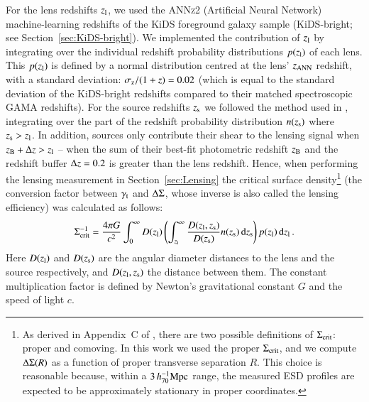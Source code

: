\documentclass{aa}
\newcommand{\hMpc}{\,h_{70}^{-1}{\rm{Mpc}} }
\renewcommand{\Upsigma}{{\rm \Sigma}}
\renewcommand{\Updelta}{{\rm \Delta}}
\newcommand{\un}[1]{_{\rm #1}}
\begin{document}
For the lens redshifts $z\un{l}$, we used the \textsc{ANNz2} (Artificial Neural Network) machine-learning redshifts of the KiDS foreground galaxy sample (KiDS-bright; see Section~\ref{sec:KiDS-bright}). We implemented the contribution of $z\un{l}$ by integrating over the individual redshift probability distributions $p(z\un{l})$ of each lens. This $p(z\un{l})$ is defined by a normal distribution centred at the lens' $z\un{ANN}$ redshift, with a standard deviation: $\sigma\un{z}/(1+z) = 0.02$ (which is equal to the standard deviation of the KiDS-bright redshifts compared to their matched spectroscopic GAMA redshifts). For the source redshifts $z\un{s}$ we followed the method used in \cite{dvornik2018}, integrating over the part of the redshift probability distribution $n(z\un{s})$ where $z\un{s}>z\un{l}$. In addition, sources only contribute their shear to the lensing signal when $z\un{B}+\Updelta z > z\un{l}$ -- when the sum of their best-fit photometric redshift $z\un{B}$ and the redshift buffer $\Updelta z=0.2$ is greater than the lens redshift. Hence, when performing the lensing measurement in Section~\ref{sec:Lensing} the critical surface density\footnote{As derived in Appendix~C of \cite{dvornik2018}, there are two possible definitions of $\Upsigma\un{crit}$: proper and comoving. In this work we used the proper $\Upsigma\un{crit}$, and we compute $\Updelta\Upsigma(R)$ as a function of proper transverse separation $R$. This choice is reasonable because, within a $3 \hMpc$ range, the measured ESD profiles are expected to be approximately stationary in proper coordinates.} (the conversion factor between $\gamma\un{t}$ and $\Updelta\Upsigma$, whose inverse is also called the lensing efficiency) was calculated as follows:
\begin{equation}
\Upsigma\un{crit}^{-1} = \frac{4\pi G}{c^2} \int_{0}^{\infty} D(z\un{l}) \left( \int_{z\un{l}}^{\infty}  \frac{D(z\un{l}, z\un{s})}{D(z\un{s})} n(z\un{s}) \, {\rm d} z\un{s} \right) p(z\un{l}) \, {\rm d} z\un{l} \, .
\label{eq:sigmacrit}
\end{equation}
Here $D(z\un{l})$ and $D(z\un{s})$ are the angular diameter distances to the lens and the source respectively, and $D(z\un{l}, z\un{s})$ the distance between them. The constant multiplication factor is defined by Newton's gravitational constant $G$ and the speed of light $c$.
\end{document}
